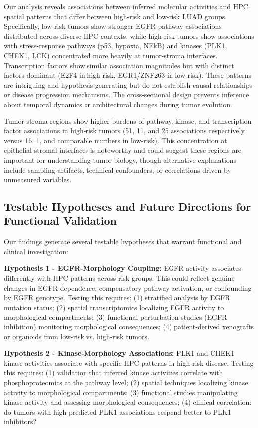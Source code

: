 \documentclass[pdflatex,article,12pt]{article}
\begin{document}
Our analysis reveals associations between inferred molecular activities and HPC spatial patterns that differ between high-risk and low-risk LUAD groups. Specifically, low-risk tumors show stronger EGFR pathway associations distributed across diverse HPC contexts, while high-risk tumors show associations with stress-response pathways (p53, hypoxia, NFkB) and kinases (PLK1, CHEK1, LCK) concentrated more heavily at tumor-stroma interfaces. Transcription factors show similar association magnitudes but with distinct factors dominant (E2F4 in high-risk, EGR1/ZNF263 in low-risk). These patterns are intriguing and hypothesis-generating but do not establish causal relationships or disease progression mechanisms. The cross-sectional design prevents inference about temporal dynamics or architectural changes during tumor evolution.

Tumor-stroma regions show higher burdens of pathway, kinase, and transcription factor associations in high-risk tumors (51, 11, and 25 associations respectively versus 16, 1, and comparable numbers in low-risk). This concentration at epithelial-stromal interfaces is noteworthy and could suggest these regions are important for understanding tumor biology, though alternative explanations include sampling artifacts, technical confounders, or correlations driven by unmeasured variables.

\subsection{Testable Hypotheses and Future Directions for Functional Validation}

Our findings generate several testable hypotheses that warrant functional and clinical investigation:

\textbf{Hypothesis 1 - EGFR-Morphology Coupling:} EGFR activity associates differently with HPC patterns across risk groups. This could reflect genuine changes in EGFR dependence, compensatory pathway activation, or confounding by EGFR genotype. Testing this requires: (1) stratified analysis by EGFR mutation status; (2) spatial transcriptomics localizing EGFR activity to morphological compartments; (3) functional perturbation studies (EGFR inhibition) monitoring morphological consequences; (4) patient-derived xenografts or organoids from low-risk vs. high-risk tumors.

\textbf{Hypothesis 2 - Kinase-Morphology Associations:} PLK1 and CHEK1 kinase activities associate with specific HPC patterns in high-risk disease. Testing this requires: (1) validation that inferred kinase activities correlate with phosphoproteomics at the pathway level; (2) spatial techniques localizing kinase activity to morphological compartments; (3) functional studies manipulating kinase activity and assessing morphological consequences; (4) clinical correlation: do tumors with high predicted PLK1 associations respond better to PLK1 inhibitors?
\end{document}
